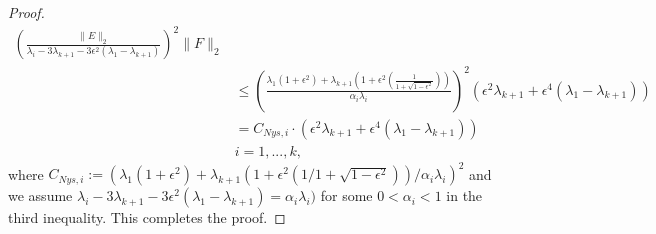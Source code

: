 \documentclass[onefignum,onetabnum]{siamart251216}
\begin{document}
\begin{proof}
\[\begin{aligned}
        \left(\frac{\|E\|_2}{\lambda_i - 3\lambda_{k+1} - 3 \epsilon^2 (\lambda_1 - \lambda_{k+1})}\right)^2 \|F\|_2 \\
        & \leq
        \left(\frac{\lambda_1 (1+ \epsilon^2) + \lambda_{k+1} \left(1 + \epsilon^2 \left(\frac{1}{1 + \sqrt{1-\epsilon^2}}\right)\right)}{\alpha_{i} \lambda_i}\right)^2 \left(\epsilon^2\lambda_{k+1} + \epsilon^4 (\lambda_1 - \lambda_{k+1}   )\right) \\
        & = C_{Nys,i} \cdot \left(\epsilon^2\lambda_{k+1} + \epsilon^4 (\lambda_1 - \lambda_{k+1})\right) \\
        & i = 1, ..., k,
    \end{aligned}  
\]
where $C_{Nys, i} := \left(\lambda_1 (1+ \epsilon^2) + \lambda_{k+1} \left(1 + \epsilon^2 \left(1 / 1 + \sqrt{1-\epsilon^2}\right)\right) / \alpha_{i} \lambda_i\right)^2$ and we assume $\lambda_i - 3\lambda_{k+1} - 3 \epsilon^2 (\lambda_1 - \lambda_{k+1}) = \alpha_i \lambda_i)$ for some $0 < \alpha_{i} < 1$ in the third inequality. This completes the proof.
\end{proof}
\end{document}
